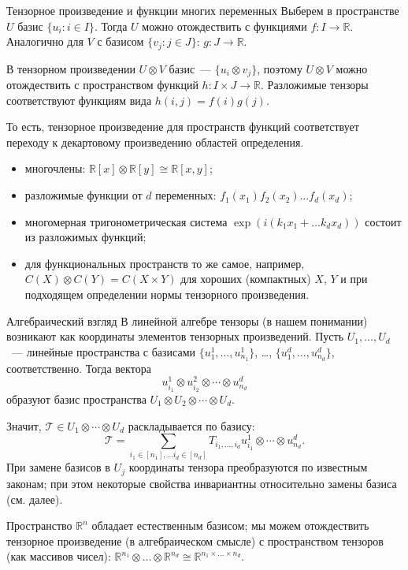 \documentclass[handout]{beamer}
\newcommand\R{\mathbb R}
\begin{document}
\begin{frame}{Тензорное произведение и функции многих переменных}
    Выберем в пространстве $U$ базис $\{u_i\colon i\in I\}$. Тогда $U$ можно
    отождествить с функциями $f\colon I\to\R$. Аналогично для
    $V$ с базисом $\{v_j\colon j\in J\}$: $g\colon J\to\R$.
    \pause\vspace{5pt}

    В тензорном произведении $U\otimes V$ базис~--- $\{u_i\otimes v_j\}$, поэтому
    $U\otimes V$ можно отождествить с пространством функций $h\colon I\times J\to \R$.
    Разложимые тензоры соответствуют функциям вида $h(i,j)=f(i)g(j)$.
    \pause\vspace{5pt}

    То есть, тензорное произведение для пространств функций соответствует
    переходу к декартовому произведению областей определения.
    \pause\vspace{5pt}

    \begin{itemize}
        \item многочлены: $\R[x]\otimes\R[y]\cong \R[x,y]$;\pause
        \item разложимые функции от $d$ переменных:
        $f_1(x_1)f_2(x_2)\ldots f_d(x_d)$;\pause
        \item многомерная тригонометрическая система $\exp(i(k_1x_1+\ldots
            k_dx_d))$ состоит из разложимых функций;\pause
    \item для функциональных пространств то же самое, например,
        $C(X)\otimes C(Y)=C(X\times Y)$ для хороших (компактных) $X$, $Y$ и при
            подходящем определении нормы тензорного произведения.
    \end{itemize}

\end{frame}

\begin{frame}{Алгебраический взгляд}
    В линейной алгебре тензоры (в нашем понимании) возникают как координаты
    элементов тензорных произведений. Пусть $U_1,\ldots,U_d$~--- линейные
    пространства с базисами $\{u^1_1,\ldots,u^1_{n_1}\}$, \ldots,
    $\{u^d_1,\ldots,u^d_{n_d}\}$, соответственно. Тогда вектора
    $$
    u^1_{i_1}\otimes u^2_{i_2}\otimes \cdots \otimes u^d_{n_d}
    $$
    образуют базис пространства $U_1\otimes U_2\otimes\cdots\otimes U_d$.
    \pause

    Значит, $\mathcal T\in U_1\otimes\cdots\otimes U_d$ раскладывается по базису:
    $$
    \mathcal T = \sum_{i_1\in[n_1],\ldots i_d\in[n_d]}
    T_{i_1,\ldots,i_d}u^1_{i_1}\otimes\cdots\otimes u^d_{n_d}.
    $$
    \pause
    При замене базисов в $U_j$ координаты тензора преобразуются по известным
    законам; при этом некоторые свойства инвариантны относительно замены базиса
    (см. далее).
    \pause

    Пространство $\R^n$ обладает естественным базисом; мы можем
    отождествить тензорное произведение (в алгебраическом смысле)
    с пространством тензоров (как массивов чисел):
    $
    \R^{n_1}\otimes\ldots\otimes\R^{n_d} \cong \R^{n_1\times\ldots\times n_d}.
    $

\end{frame}
\end{document}
